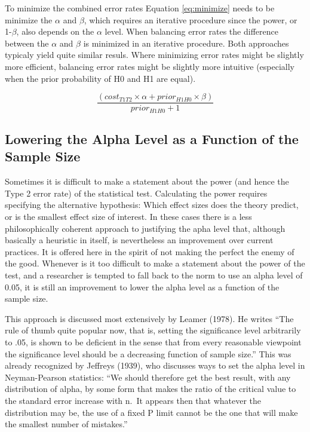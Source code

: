 \documentclass[,jou,floatsintext]{apa6}
\begin{document}
To minimize the combined error rates Equation \eqref{eq:minimize} needs to be minimize the \(\alpha\) and \(\beta\), which requires an iterative procedure since the power, or 1-\(\beta\), also depends on the \(\alpha\) level. When balancing error rates the difference between the \(\alpha\) and \(\beta\) is minimized in an iterative procedure. Both approaches typicaly yield quite similar resuls. Where minimizing error rates might be slightly more efficient, balancing error rates might be slightly more intuitive (especially when the prior probability of H0 and H1 are equal).

\begin{equation}
\frac{(cost_{T1T2} \times \alpha + prior_{H1H0} \times \beta)}{prior_{H1H0}+1}
\label{eq:minimize}
\end{equation}

\hypertarget{lowering-the-alpha-level-as-a-function-of-the-sample-size}{%
\subsection{Lowering the Alpha Level as a Function of the Sample Size}\label{lowering-the-alpha-level-as-a-function-of-the-sample-size}}

Sometimes it is difficult to make a statement about the power (and hence the Type 2 error rate) of the statistical test. Calculating the power requires specifying the alternative hypothesis: Which effect sizes does the theory predict, or is the smallest effect size of interest. In these cases there is a less philosophically coherent approach to justifying the apha level that, although basically a heuristic in itself, is nevertheless an improvement over current practices. It is offered here in the spirit of not making the perfect the enemy of the good. Whenever is it too difficult to make a statement about the power of the test, and a researcher is tempted to fall back to the norm to use an alpha level of 0.05, it is still an improvement to lower the alpha level as a function of the sample size.

This approach is discussed most extensively by Leamer (1978). He writes \enquote{The rule of thumb quite popular now, that is, setting the significance level arbitrarily to .05, is shown to be deficient in the sense that from every reasonable viewpoint the significance level should be a decreasing function of sample size.} This was already recognized by Jeffreys (1939), who discusses ways to set the alpha level in Neyman-Pearson statistics: \enquote{We should therefore get the best result, with any distribution of alpha, by some form that makes the ratio of the critical value to the standard error increase with n.~It appears then that whatever the distribution may be, the use of a fixed P limit cannot be the one that will make the smallest number of mistakes.}
\end{document}
